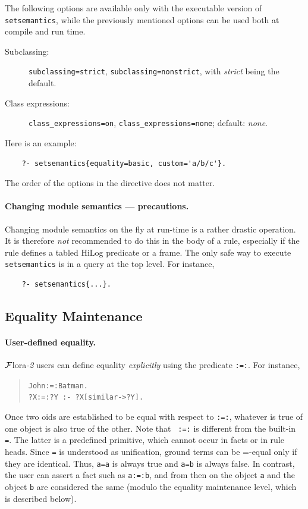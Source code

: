 \documentclass[11pt]{article}
\newcommand{\FLORA}{{\mbox{\sc ${\cal F}${lora}\rm\emph{-2}}}\xspace}
\newcommand{\FLSYSTEM}{\FLORA}
\begin{document}
The following options are available only with the executable version of
\texttt{setsemantics}, while the previously mentioned options can be used both
at compile and run time.
  \begin{description}
  \item[Subclassing:] \texttt{subclassing=strict},
    \texttt{subclassing=nonstrict}, with \emph{strict} being the default.    
  \item[Class expressions:] \texttt{class\_expressions=on},
    \texttt{class\_expressions=none}; default: \emph{none}.
  \end{description}
Here is an example:
\begin{verbatim}
    ?- setsemantics{equality=basic, custom='a/b/c'}.  
\end{verbatim}
The order of the options in the directive does not matter.

\paragraph{Changing module semantics --- precautions.}
Changing module semantics on the fly at run-time is a rather drastic operation.
It is therefore \emph{not} recommended to do this in the body of a rule,
especially if the rule defines a tabled HiLog predicate or a frame.
The only safe way to execute {\tt setsemantics} is in a query at the top
level. For instance, 
  \begin{verbatim}
    ?- setsemantics{...}.
  \end{verbatim}


\subsection{Equality Maintenance}\label{sec-eqmaintain}


\paragraph{User-defined equality.}
\FLSYSTEM users can define equality \emph{explicitly}
using the predicate {\tt :=:}. For instance,
\begin{quote}
{\tt John:=:Batman.} \\
{\tt ?X:=:?Y :- ?X[similar->?Y].} \\
\end{quote}
Once two oids are established to be equal with respect to {\tt :=:},
whatever is true of one object is also true of the other. Note that {\tt
  :=:} is different from the built-in {\tt =}. The latter is a predefined
primitive, which cannot occur in facts or in rule heads.  
Since {\tt =} is understood as unification, ground terms can be 
  =-equal only if they are identical. Thus, {\tt a=a} is always true and
{\tt a=b} is always false. In contrast, the user can assert a fact such as
{\tt a:=:b}, and from then on the object {\tt a} and the object {\tt b} are
considered the same (modulo the equality maintenance level, which is
described below).       
\end{document}
